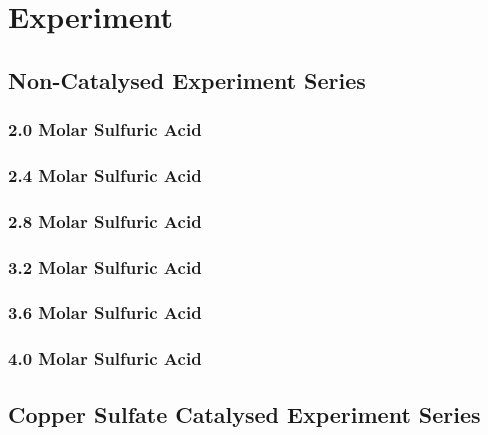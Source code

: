 \chapter {Experiment}

\section{Non-Catalysed Experiment Series}

	\subsection{2.0 Molar Sulfuric Acid}

	\subsection{2.4 Molar Sulfuric Acid}

	\subsection{2.8 Molar Sulfuric Acid}

	\subsection{3.2 Molar Sulfuric Acid}

	\subsection{3.6 Molar Sulfuric Acid}

	\subsection{4.0 Molar Sulfuric Acid}

\section{Copper Sulfate Catalysed Experiment Series}

